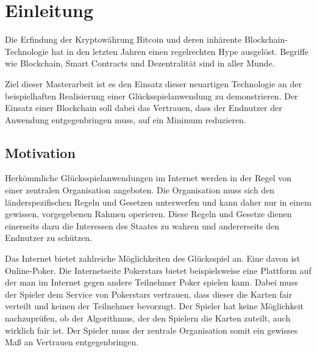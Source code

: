 \chapter{Einleitung} %
\label{Chapter1}
\newcommand{\keyword}[1]{\textbf{#1}}
\newcommand{\tabhead}[1]{\textbf{#1}}
\newcommand{\code}[1]{\texttt{#1}}
\newcommand{\file}[1]{\texttt{\bfseries#1}}
\newcommand{\option}[1]{\texttt{\itshape#1}}
Die Erfindung der Kryptowährung Bitcoin und deren inhärente Blockchain-Technologie hat in den letzten Jahren einen regelrechten Hype ausgelöst. Begriffe wie Blockchain, Smart Contracts und Dezentralität sind in aller Munde. 

Ziel dieser Masterarbeit ist es den Einsatz dieser neuartigen Technologie an der beispielhaften Realisierung einer Glücksspielanwendung zu demonstrieren. Der Einsatz einer Blockchain soll dabei das Vertrauen, dass der Endnutzer der Anwendung entgegenbringen muss, auf ein Minimum reduzieren. 

\section{Motivation}


Herkömmliche Glücksspielanwendungen im Internet werden in der Regel von einer zentralen Organisation angeboten. Die Organisation muss sich den länderspezifischen Regeln und Gesetzen unterwerfen und kann daher nur in einem gewissen, vorgegebenen Rahmen operieren. Diese Regeln und Gesetze dienen einerseits dazu die Interessen des Staates zu wahren und andererseits den Endnutzer zu schützen. 

Das Internet bietet zahlreiche Möglichkeiten des Glücksspiel an. Eine davon ist Online-Poker. Die Internetseite Pokerstars \cite{pokerstars} bietet beispielsweise eine Plattform auf der man im Internet gegen andere Teilnehmer Poker spielen kann. Dabei muss der Spieler dem Service von Pokerstars vertrauen, dass dieser die Karten fair verteilt und keinen der Teilnehmer bevorzugt. Der Spieler hat keine Möglichkeit nachzuprüfen, ob der Algorithmus, der den Spielern die Karten zuteilt, auch wirklich fair ist. Der Spieler muss der zentrale Organisation somit ein gewisses Maß an Vertrauen entgegenbringen. 


